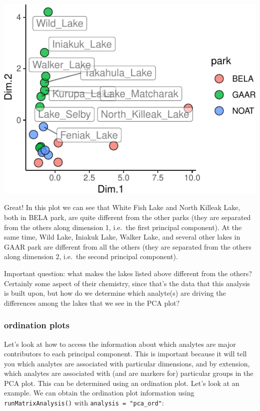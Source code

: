 \documentclass[
]{krantz}
\begin{document}
\begin{center}\includegraphics[width=0.8\linewidth]{index_files/figure-latex/unnamed-chunk-96-1} \end{center}

Great! In this plot we can see that White Fish Lake and North Killeak Lake, both in BELA park, are quite different from the other parks (they are separated from the others along dimension 1, i.e.~the first principal component). At the same time, Wild Lake, Iniakuk Lake, Walker Lake, and several other lakes in GAAR park are different from all the others (they are separated from the others along dimension 2, i.e.~the second principal component).

Important question: what makes the lakes listed above different from the others? Certainly some aspect of their chemistry, since that's the data that this analysis is built upon, but how do we determine which analyte(s) are driving the differences among the lakes that we see in the PCA plot?

\hypertarget{ordination-plots}{%
\subsubsection{ordination plots}\label{ordination-plots}}

Let's look at how to access the information about which analytes are major contributors to each principal component. This is important because it will tell you which analytes are associated with particular dimensions, and by extension, which analytes are associated with (and are markers for) particular groups in the PCA plot. This can be determined using an ordination plot. Let's look at an example. We can obtain the ordination plot information using \texttt{runMatrixAnalysis()} with \texttt{analysis\ =\ "pca\_ord"}:
\end{document}
